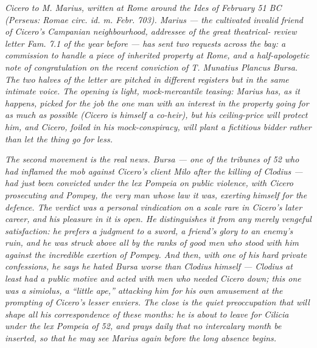 
\textit{Cicero to M. Marius, written at Rome around the Ides of
February 51 BC (Perseus: \textit{Romae circ. id. m. Febr. 703}).
Marius --- the cultivated invalid friend of Cicero's
Campanian neighbourhood, addressee of the great theatrical-
review letter \textit{Fam.} 7.1 of the year before --- has sent
two requests across the bay: a commission to handle a piece of
inherited property at Rome, and a half-apologetic note of
congratulation on the recent conviction of T. Munatius Plancus
Bursa. The two halves of the letter are pitched in different
registers but in the same intimate voice. The opening is light,
mock-mercantile teasing: Marius has, as it happens, picked for
the job the one man with an interest in the property going for
as much as possible (Cicero is himself a co-heir), but his
ceiling-price will protect him, and Cicero, foiled in his
mock-conspiracy, will plant a fictitious bidder rather than let
the thing go for less.}

\textit{The second movement is the real news. Bursa --- one of
the tribunes of 52 who had inflamed the mob against Cicero's
client Milo after the killing of Clodius --- had just been
convicted under the lex Pompeia on public violence, with Cicero
prosecuting and Pompey, the very man whose law it was, exerting
himself for the defence. The verdict was a personal vindication
on a scale rare in Cicero's later career, and his pleasure in
it is open. He distinguishes it from any merely vengeful
satisfaction: he prefers a judgment to a sword, a friend's
glory to an enemy's ruin, and he was struck above all by the
ranks of good men who stood with him against the incredible
exertion of Pompey. And then, with one of his hard private
confessions, he says he hated Bursa worse than Clodius himself
--- Clodius at least had a public motive and acted with men who
needed Cicero down; this one was a \textit{simiolus}, a ``little
ape,'' attacking him for his own amusement at the prompting of
Cicero's lesser enviers. The close is the quiet preoccupation
that will shape all his correspondence of these months: he is
about to leave for Cilicia under the \textit{lex Pompeia} of 52,
and prays daily that no intercalary month be inserted, so that
he may see Marius again before the long absence begins.}
